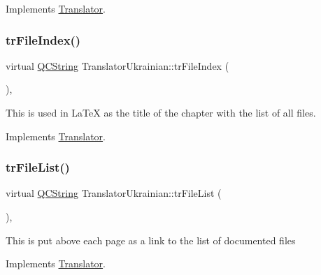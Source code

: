 Implements \mbox{\hyperlink{class_translator}{Translator}}.

\mbox{\label{class_translator_ukrainian_a276909543c3269dd38c4ce76b5ddc503}} 
\subsubsection{\texorpdfstring{trFileIndex()}{trFileIndex()}}
{\footnotesize\ttfamily virtual \mbox{\hyperlink{class_q_c_string}{Q\+C\+String}} Translator\+Ukrainian\+::tr\+File\+Index (\begin{DoxyParamCaption}{ }\end{DoxyParamCaption})\hspace{0.3cm}{\ttfamily [inline]}, {\ttfamily [virtual]}}

This is used in La\+TeX as the title of the chapter with the list of all files. 

Implements \mbox{\hyperlink{class_translator}{Translator}}.

\mbox{\label{class_translator_ukrainian_ae81294133bb054f9fe4c2fcf5de8bbc8}} 
\subsubsection{\texorpdfstring{trFileList()}{trFileList()}}
{\footnotesize\ttfamily virtual \mbox{\hyperlink{class_q_c_string}{Q\+C\+String}} Translator\+Ukrainian\+::tr\+File\+List (\begin{DoxyParamCaption}{ }\end{DoxyParamCaption})\hspace{0.3cm}{\ttfamily [inline]}, {\ttfamily [virtual]}}

This is put above each page as a link to the list of documented files 

Implements \mbox{\hyperlink{class_translator}{Translator}}.

\mbox{\label{class_translator_ukrainian_a624a1aa899a30bc4ffab95f1f2d4fb98}} 
